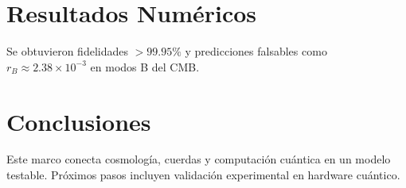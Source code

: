 \documentclass[11pt]{article}
\begin{document}
\section{Resultados Numéricos}
Se obtuvieron fidelidades $> 99.95\%$ y predicciones falsables como $r_B \approx 2.38 \times 10^{-3}$ en modos B del CMB.

\section{Conclusiones}
Este marco conecta cosmología, cuerdas y computación cuántica en un modelo testable. Próximos pasos incluyen validación experimental en hardware cuántico.



\end{document}
